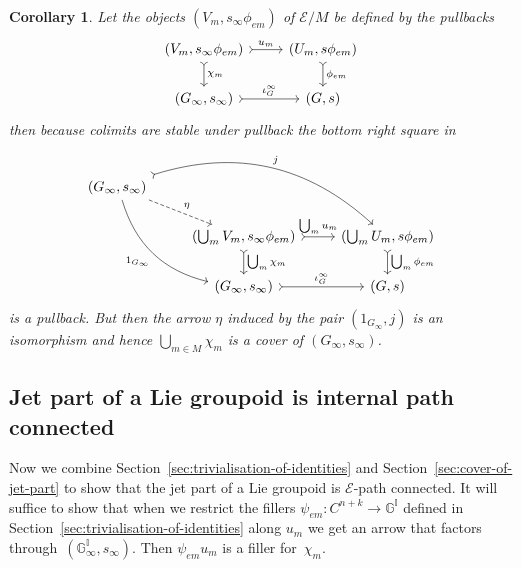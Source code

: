 \documentclass[pdftex]{sigma}
\numberwithin{equation}{section}
\newtheorem{Corollary}[Theorem]{Corollary}
\begin{document}
\begin{Corollary}\label{corollary:Cover of Ginfty}
Let the objects $(V_{m},s_{\infty}\phi_{em})$ of $\mathcal{E}/M$ be defined by the pullbacks
\begin{equation*}\begin{tikzcd}
(V_{m},s_{\infty}\phi_{em}) \dar[rightarrowtail]{\chi_{m}} \rar[rightarrowtail]{u_m} & (U_{m},s\phi_{em}) \dar[rightarrowtail]{\phi_{em}} \\
(G_{\infty},s_{\infty}) \rar[rightarrowtail]{\iota_G^{\infty}} & (G,s)
\end{tikzcd}\end{equation*}
then because colimits are stable under pullback the bottom right square in
\begin{equation*}\begin{tikzcd}
(G_{\infty},s_{\infty})\arrow[bend left,rightarrowtail]{drr}{j} \arrow[bend right]{ddr}[swap]{1_{G_{\infty}}} \arrow[dashed]{dr}{\eta}& {} & {}\\
{} & (\bigcup_{m}V_{m},s_{\infty}\phi_{em}) \rar[rightarrowtail]{\bigcup_{m}u_m} \dar[rightarrowtail]{\bigcup_m \chi_{m}} & (\bigcup_{m}U_{m},s\phi_{em}) \dar[rightarrowtail]{\bigcup_m \phi_{em}}\\
{} & (G_{\infty},s_{\infty}) \rar[rightarrowtail]{\iota_G^{\infty}} & (G,s)
\end{tikzcd}\end{equation*}
is a pullback. But then the arrow $\eta$ induced by the pair $(1_{G_{\infty}},j)$ is an isomorphism and hence $\bigcup_{m\in M}\chi_{m}$ is a cover of $(G_{\infty},s_{\infty})$.
\end{Corollary}

\subsection{Jet part of a Lie groupoid is internal path connected}\label{sec:jet-part-path-connected}

Now we combine Section~\ref{sec:trivialisation-of-identities} and Section~\ref{sec:cover-of-jet-part} to show that the jet part of a Lie groupoid is $\mathcal{E}$-path connected. It will suf\/f\/ice to show that when we restrict the f\/illers $\psi_{em}\colon C^{n+k}\rightarrow \mathbb{G}^{\mathbb{I}}$ def\/ined in Section~\ref{sec:trivialisation-of-identities} along $u_m$ we get an arrow that factors through~$(\mathbb{G}_{\infty}^{\mathbb{I}},s_{\infty})$. Then $\psi_{em}u_m$ is a f\/iller for~$\chi_m$.
\end{document}
